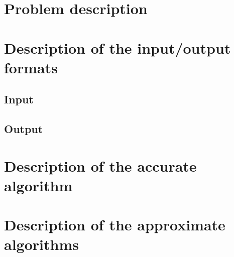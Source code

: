 \documentclass{article}
\begin{document}
\tableofcontents

\pagebreak[4]

\section{Problem description}


\section{Description of the input/output formats}

\subsection{Input}


\subsection{Output}


\pagebreak[4]

\section{Description of the accurate algorithm}


\section{Description of the approximate algorithms}



\pagebreak[4]




\end{document}
